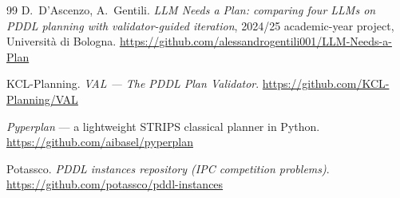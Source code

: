 \documentclass[11pt,a4paper]{article}
\begin{document}
\begin{thebibliography}{99}
D.~D'Ascenzo, A.~Gentili.
\newblock \emph{LLM Needs a Plan: comparing four LLMs on PDDL planning
with validator-guided iteration},
2024/25 academic-year project, Università di Bologna.
\newblock \url{https://github.com/alessandrogentili001/LLM-Needs-a-Plan}

KCL-Planning.
\newblock \emph{VAL --- The PDDL Plan Validator}.
\newblock \url{https://github.com/KCL-Planning/VAL}

\emph{Pyperplan} --- a lightweight STRIPS classical planner in Python.
\newblock \url{https://github.com/aibasel/pyperplan}

Potassco.
\newblock \emph{PDDL instances repository (IPC competition problems)}.
\newblock \url{https://github.com/potassco/pddl-instances}

\end{thebibliography}
\end{document}
